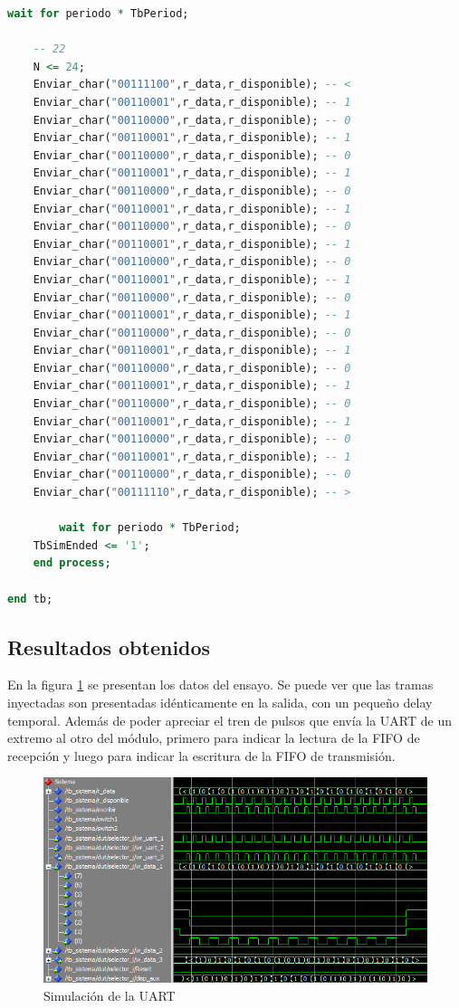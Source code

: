 \begin{lstlisting}[language = vhdl,caption=Testbench del módulo UART,label={lst:test_uart}]
	wait for periodo * TbPeriod;

	-- 22
	N <= 24; 	
	Enviar_char("00111100",r_data,r_disponible); -- < 	
	Enviar_char("00110001",r_data,r_disponible); -- 1 	
	Enviar_char("00110000",r_data,r_disponible); -- 0
 	Enviar_char("00110001",r_data,r_disponible); -- 1 	
	Enviar_char("00110000",r_data,r_disponible); -- 0
	Enviar_char("00110001",r_data,r_disponible); -- 1 	
	Enviar_char("00110000",r_data,r_disponible); -- 0
	Enviar_char("00110001",r_data,r_disponible); -- 1 	
	Enviar_char("00110000",r_data,r_disponible); -- 0
	Enviar_char("00110001",r_data,r_disponible); -- 1 	
	Enviar_char("00110000",r_data,r_disponible); -- 0
	Enviar_char("00110001",r_data,r_disponible); -- 1 	
	Enviar_char("00110000",r_data,r_disponible); -- 0
	Enviar_char("00110001",r_data,r_disponible); -- 1 	
	Enviar_char("00110000",r_data,r_disponible); -- 0
	Enviar_char("00110001",r_data,r_disponible); -- 1 	
	Enviar_char("00110000",r_data,r_disponible); -- 0
	Enviar_char("00110001",r_data,r_disponible); -- 1 	
	Enviar_char("00110000",r_data,r_disponible); -- 0
	Enviar_char("00110001",r_data,r_disponible); -- 1 	
	Enviar_char("00110000",r_data,r_disponible); -- 0
	Enviar_char("00110001",r_data,r_disponible); -- 1 
	Enviar_char("00110000",r_data,r_disponible); -- 0	
	Enviar_char("00111110",r_data,r_disponible); -- >
	
        wait for periodo * TbPeriod;
	TbSimEnded <= '1';
    end process;
	
end tb;

		\end{lstlisting}
			
	\subsection{Resultados obtenidos}
				
		En la figura \ref{fig:Test_UART} se presentan los datos del ensayo. Se puede ver que las tramas inyectadas son presentadas idénticamente en la salida, con un pequeño delay temporal. Además de poder apreciar el tren de pulsos que envía la UART de un extremo al otro del módulo, primero para indicar la lectura de la FIFO de recepción y luego para indicar la escritura de la FIFO de transmisión.
		
		\begin{figure}[h]
		\centering
		\includegraphics[scale=0.7]{./Figures/Test/UART}
			\caption{Simulación de la UART}
			\label{fig:Test_UART}
		\end{figure}
			
